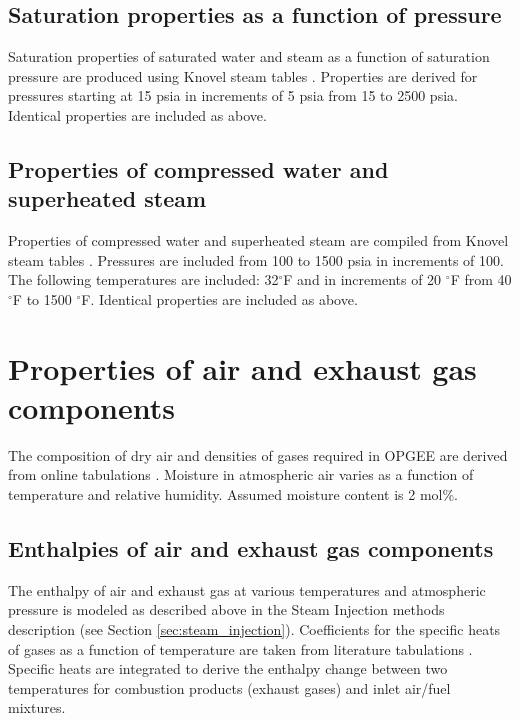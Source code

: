 \documentclass[11pt]{report}
\newcommand{\marg}[1]{{\footnotesize\textit{\textcolor{stanford}{'#1'}}}}
\newcommand{\marginnote}[1]{\marginpar{\marg{#1}}}
\begin{document}
{{{{\subsection{Saturation properties as a function of pressure}
Saturation properties of \marginnote{Input \\ Data \\ Table 5.3} saturated water and steam as a function of saturation pressure are produced using Knovel steam tables \cite[Table 1d]{Knovel2006}. Properties are derived for pressures starting at 15 psia in increments of 5 psia from 15 to 2500 psia. Identical properties are included as above.

\subsection{Properties of compressed water and superheated steam}
Properties of compressed water and superheated steam are compiled \marginnote{Input \\ Data \\ Table 5.4} from Knovel steam tables \cite[Table 2b]{Knovel2006}. Pressures are included from 100 to 1500 psia in increments of 100. The following temperatures are included: 32$^\circ$F and in increments of 20 $^\circ$F from 40 $^\circ$F to 1500 $^\circ$F. Identical properties are included as above.



\section{Properties of air and exhaust gas components}

The composition of dry air and densities of gases required in OPGEE are derived from online tabulations \cite{EngToolbox}. \marginnote{Input \\ Data \\ Table 2.2} Moisture in atmospheric air varies as a function of temperature and relative humidity. Assumed moisture content is 2 mol\%.


\subsection{Enthalpies of air and exhaust gas components}\label{sec:flue_gas_enthalpy}

The enthalpy of air and exhaust gas at various temperatures and atmospheric pressure is modeled as described above in the Steam Injection methods description (see Section \ref{sec:steam_injection}). \marginnote{Input \\ Data \\ Tables 4.1 - 4.7} Coefficients for the specific heats of gases as a function of temperature are taken from literature tabulations \cite[Table A2-E]{Cengel2006}. Specific heats are integrated to derive the enthalpy change between two temperatures for combustion products (exhaust gases) and inlet air/fuel mixtures.




}}}}
\end{document}
